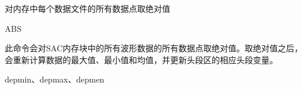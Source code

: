 \label{cmd:abs}

对内存中每个数据文件的所有数据点取绝对值

\begin{SACSTX}
ABS
\end{SACSTX}

此命令会对SAC内存块中的所有波形数据的所有数据点取绝对值。取绝对值之后，
会重新计算数据的最大值、最小值和均值，并更新头段区的相应头段变量。

depmin、depmax、depmen

